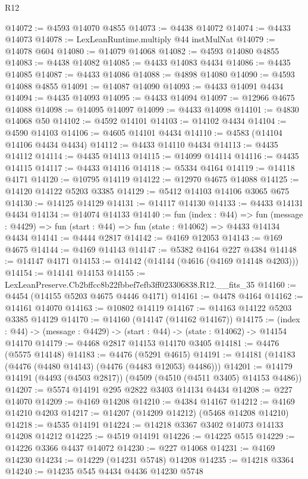 \begin{lexlean}{R12}
\begin{coremodule}
@14072 := @4593 @14070 @4855
@14073 := @4438 @14072
@14074 := @4433 @14073
@14078 := LexLeanRuntime.multiply @44 instMulNat
@14079 := @14078 @604
@14080 := @14079 @14068
@14082 := @4593 @14080 @4855
@14083 := @4438 @14082
@14085 := @4433 @14083 @4434
@14086 := @4435 @14085
@14087 := @4433 @14086
@14088 := @4898 @14080
@14090 := @4593 @14088 @4855
@14091 := @14087 @14090
@14093 := @4433 @14091 @4434
@14094 := @4435 @14093
@14095 := @4433 @14094
@14097 := @12966 @4675 @14088
@14098 := @14095 @14097
@14099 := @4433 @14098
@14101 := @4830 @14068 @50
@14102 := @4592 @14101
@14103 := @14102 @4434
@14104 := @4590 @14103
@14106 := @4605 @14101 @4434
@14110 := @4583 (@14104 @14106 @4434 @4434)
@14112 := @4433 @14110 @4434
@14113 := @4435 @14112
@14114 := @4435 @14113
@14115 := @14099 @14114
@14116 := @4435 @14115
@14117 := @4433 @14116
@14118 := @5334 @4164
@14119 := @14118 @4171
@14120 := @10795 @14119
@14122 := @12970 @4675 @14088
@14125 := @14120 @14122 @5203 @3385
@14129 := @5412 @14103 @14106 @3065 @675
@14130 := @14125 @14129
@14131 := @14117 @14130
@14133 := @4433 @14131 @4434
@14134 := @14074 @14133
@14140 := fun (index : @44) =>
  fun (message : @4429) => fun (start : @44) => fun (state : @14062) => @4433 @14134 @4434
@14141 := @4444 @2817
@14142 := @4169 @12053
@14143 := @169 @4675
@14144 := @4169 @14143
@14147 := @5382 @4164 @227 @4384
@14148 := @14147 @4171
@14153 := @14142 (@14144 (@4616 (@4169 @14148 @4203)))
@14154 := @14141 @14153
@14155 := LexLeanPreserve.Cb2bffcc8b22fbbef7efb3ff023306838.R12.__fits_35
@14160 := @4454 (@14155 @5203 @4675 @4446 @4171)
@14161 := @4478 @4164
@14162 := @14161 @14070
@14163 := @10802 @14119
@14167 := @14163 @14122 @5203 @3385 @14129
@14170 := @14160 (@14147 (@14162 @14167))
@14175 := (index : @44) -> (message : @4429) -> (start : @44) -> (state : @14062) -> @14154 @14170
@14179 := @4468 @2817 @14153 @14170 @3405
@14181 := @4476 (@5575 @14148)
@14183 := @4476 (@5291 @4615)
@14191 := @14181 (@14183 (@4476 (@4480 @14143) (@4476 (@4483 @12053) @4486)))
@14201 := @14179 @14191 (@4493 (@4503 @2817)) (@4509 (@4510 (@4511 @3405) @14153 @4486))
@14207 := @5574 @14191 @295 @2822 @3403 @14134 @4434
@14208 := @227 @14070
@14209 := @4169 @14208
@14210 := @4384 @14167
@14212 := @4169 @14210 @4203
@14217 := @14207 (@14209 @14212) (@5468 @14208 @14210)
@14218 := @4535 @14191
@14224 := @14218 @3367 @3402 @14073 @14133 @14208 @14212
@14225 := @4519 @14191
@14226 := @14225 @515
@14229 := @14226 @3366 @4437 @14072
@14230 := @227 @14068
@14231 := @4169 @14230
@14234 := @14229 (@14231 @5748) @14208
@14235 := @14218 @3364
@14240 := @14235 @545 @4434 @4436 @14230 @5748

\end{coremodule}
\end{lexlean}
